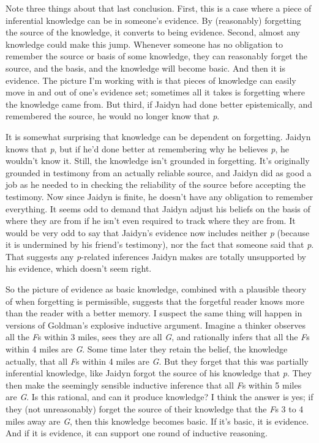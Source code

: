 \documentclass[
  10pt,
  letterpaper,
  twoside]{scrbook}
\begin{document}
Note three things about that last conclusion. First, this is a case
where a piece of inferential knowledge can be in someone's evidence. By
(reasonably) forgetting the source of the knowledge, it converts to
being evidence. Second, almost any knowledge could make this jump.
Whenever someone has no obligation to remember the source or basis of
some knowledge, they can reasonably forget the source, and the basis,
and the knowledge will become basic. And then it is evidence. The
picture I'm working with is that pieces of knowledge can easily move in
and out of one's evidence set; sometimes all it takes is forgetting
where the knowledge came from. But third, if Jaidyn had done better
epistemically, and remembered the source, he would no longer know that
\emph{p}.

It is somewhat surprising that knowledge can be dependent on forgetting.
Jaidyn knows that \emph{p}, but if he'd done better at remembering why
he believes \emph{p}, he wouldn't know it. Still, the knowledge isn't
grounded in forgetting. It's originally grounded in testimony from an
actually reliable source, and Jaidyn did as good a job as he needed to
in checking the reliability of the source before accepting the
testimony. Now since Jaidyn is finite, he doesn't have any obligation to
remember everything. It seems odd to demand that Jaidyn adjust his
beliefs on the basis of where they are from if he isn't even required to
track where they are from. It would be very odd to say that Jaidyn's
evidence now includes neither \emph{p} (because it is undermined by his
friend's testimony), nor the fact that someone said that \emph{p}. That
suggests any \emph{p}-related inferences Jaidyn makes are totally
unsupported by his evidence, which doesn't seem right.

So the picture of evidence as basic knowledge, combined with a plausible
theory of when forgetting is permissible, suggests that the forgetful
reader knows more than the reader with a better memory. I suspect the
same thing will happen in versions of Goldman's explosive inductive
argument. Imagine a thinker observes all the \emph{F}s within 3 miles,
sees they are all \emph{G}, and rationally infers that all the \emph{F}s
within 4 miles are \emph{G}. Some time later they retain the belief, the
knowledge actually, that all \emph{F}s within 4 miles are \emph{G}. But
they forget that this was partially inferential knowledge, like Jaidyn
forgot the source of his knowledge that \emph{p}. They then make the
seemingly sensible inductive inference that all \emph{F}s within 5 miles
are \emph{G}. Is this rational, and can it produce knowledge? I think
the answer is yes; if they (not unreasonably) forget the source of their
knowledge that the \emph{F}s 3 to 4 miles away are \emph{G}, then this
knowledge becomes basic. If it's basic, it is evidence. And if it is
evidence, it can support one round of inductive reasoning.
\end{document}
